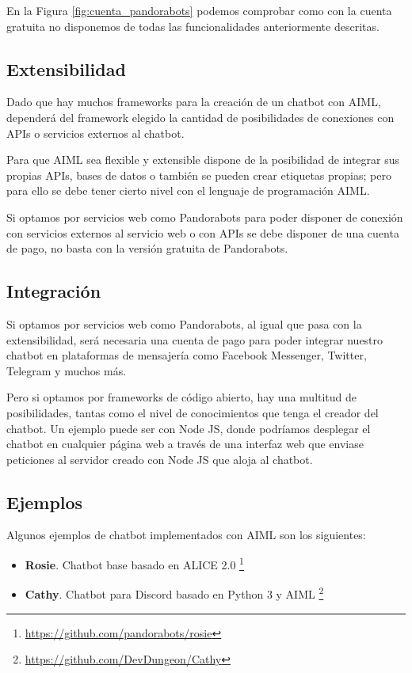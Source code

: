 En la Figura \ref{fig:cuenta_pandorabots} podemos comprobar como con la cuenta gratuita no disponemos de todas las funcionalidades anteriormente descritas.

\subsection*{Extensibilidad}

Dado que hay muchos \glspl{framework} para la creación de un chatbot con AIML, dependerá del \gls{framework} elegido la cantidad de posibilidades de conexiones con \glspl{API} o servicios externos al chatbot.

Para que AIML sea flexible y extensible dispone de la posibilidad de integrar sus propias \glspl{API}, bases de datos o también se pueden crear etiquetas propias; pero para ello se debe tener cierto nivel con el lenguaje de programación AIML.

Si optamos por servicios web como Pandorabots para poder disponer de conexión con servicios externos al servicio web o con \glspl{API} se debe disponer de una cuenta de pago, no basta con la versión gratuita de Pandorabots.

\subsection*{Integración}

Si optamos por servicios web como Pandorabots, al igual que pasa con la extensibilidad, será necesaria una cuenta de pago para poder integrar nuestro chatbot en plataformas de mensajería como Facebook Messenger, Twitter, Telegram y muchos más.

Pero si optamos por \glspl{framework} de código abierto, hay una multitud de posibilidades, tantas como el nivel de conocimientos que tenga el creador del chatbot. Un ejemplo puede ser con Node JS, donde podríamos desplegar el chatbot en cualquier página web a través de una interfaz web que enviase peticiones al servidor creado con Node JS que aloja al chatbot.

\subsection*{Ejemplos}

Algunos ejemplos de chatbot implementados con AIML son los siguientes:

\begin{itemize}
\item \textbf{Rosie}. Chatbot base basado en ALICE 2.0 \footnote{\url{https://github.com/pandorabots/rosie}}
\item \textbf{Cathy}. Chatbot para Discord basado en Python 3 y AIML \footnote{\url{https://github.com/DevDungeon/Cathy}}
\end{itemize}


